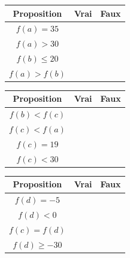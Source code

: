 {	\begin{center}
\def\arraystretch{1.5}
\setlength\tabcolsep{6pt}
	\begin{tabular}{|c|c|c|} \hline
		Proposition & Vrai & Faux \\ \hline
		$f(a) = 35$ & & \checkmark \\ \hline
		$f(a) > 30$ & \checkmark & \\ \hline
		$f(b) \leq 20$ & \checkmark & \\ \hline
		$f(a) > f(b)$ & \checkmark & \\ \hline
	\end{tabular}	
	\hfill
	\begin{tabular}{|c|c|c|} \hline
		Proposition & Vrai & Faux \\ \hline
		$f(b) < f(c)$ & \checkmark & \\ \hline
		$f(c) < f(a)$ & \checkmark & \\ \hline
		$f(c) = 19$ & & \checkmark \\ \hline
		$f(c) < 30$ & \checkmark & \\ \hline
	\end{tabular}
	\hfill
	\begin{tabular}{|c|c|c|} \hline
		Proposition & Vrai & Faux \\ \hline
		$f(d) = -5$ & & \checkmark \\ \hline
		$f(d) < 0$ & & \checkmark \\ \hline
		$f(c) = f(d)$ & & \checkmark \\ \hline
		$f(d) \geq -30$ & \checkmark & \\ \hline
	\end{tabular}
	\end{center}
}



